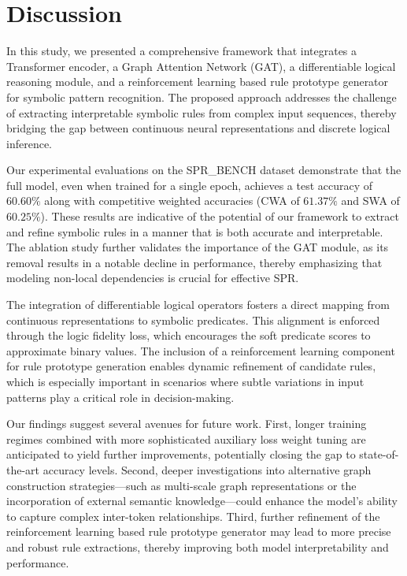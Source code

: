 \documentclass{article}
\begin{document}
\section{Discussion}
In this study, we presented a comprehensive framework that integrates a Transformer encoder, a Graph Attention Network (GAT), a differentiable logical reasoning module, and a reinforcement learning based rule prototype generator for symbolic pattern recognition. The proposed approach addresses the challenge of extracting interpretable symbolic rules from complex input sequences, thereby bridging the gap between continuous neural representations and discrete logical inference.

Our experimental evaluations on the SPR\_BENCH dataset demonstrate that the full model, even when trained for a single epoch, achieves a test accuracy of \(60.60\%\) along with competitive weighted accuracies (CWA of \(61.37\%\) and SWA of \(60.25\%\)). These results are indicative of the potential of our framework to extract and refine symbolic rules in a manner that is both accurate and interpretable. The ablation study further validates the importance of the GAT module, as its removal results in a notable decline in performance, thereby emphasizing that modeling non-local dependencies is crucial for effective SPR.

The integration of differentiable logical operators fosters a direct mapping from continuous representations to symbolic predicates. This alignment is enforced through the logic fidelity loss, which encourages the soft predicate scores to approximate binary values. The inclusion of a reinforcement learning component for rule prototype generation enables dynamic refinement of candidate rules, which is especially important in scenarios where subtle variations in input patterns play a critical role in decision-making.

Our findings suggest several avenues for future work. First, longer training regimes combined with more sophisticated auxiliary loss weight tuning are anticipated to yield further improvements, potentially closing the gap to state-of-the-art accuracy levels. Second, deeper investigations into alternative graph construction strategies—such as multi-scale graph representations or the incorporation of external semantic knowledge—could enhance the model’s ability to capture complex inter-token relationships. Third, further refinement of the reinforcement learning based rule prototype generator may lead to more precise and robust rule extractions, thereby improving both model interpretability and performance.
\end{document}
